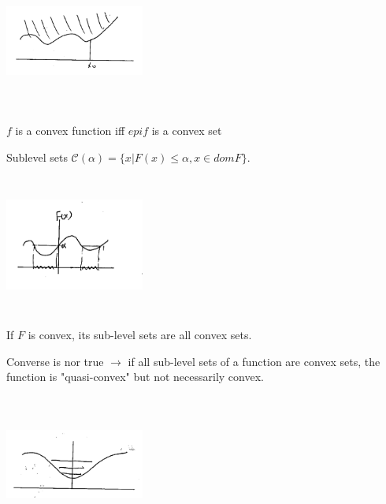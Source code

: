 \begin{marginfigure}
	\centering
	\includegraphics[width=1.8in,height=1.8in]{figures/ch08/figure1030_11.png}
\end{marginfigure}

\begin{definition}
	$f$ is a convex function iff $epif$ is a convex set
\end{definition}

\begin{definition}{Sublevel sets}
	$\mathcal{C}(\alpha) = \{x|F(x)\leq \alpha, x\in domF \}$.
	
	\begin{marginfigure}
	\centering
	\includegraphics[width=1.8in,height=1.8in]{figures/ch08/figure1030_12.png}
	\end{marginfigure}
\end{definition}

\begin{theorem}
	If $F$ is convex, its sub-level sets are all convex sets.
\end{theorem}

Converse is nor true $\rightarrow$ if all sub-level sets of a function are convex sets, the function is "quasi-convex" but not necessarily convex.\\

\begin{marginfigure}
	\centering
	\includegraphics[width=1.8in,height=1.8in]{figures/ch08/figure1030_13.png}
\end{marginfigure}

